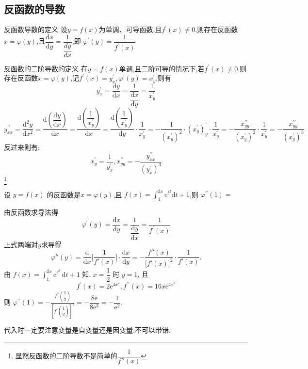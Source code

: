 \documentclass[8pt a4paper, oneside, UTF8]{ctexbook}  %
\begin{document}
\begin{sloppypar}
    \subsection{反函数的导数}
    \begin{defn}{反函数导数的定义}{}
        设$y=f(x)$为单调、可导函数,且$f^{\prime}(x)\neq0$,则存在反函数$x=\varphi(y)$,且$\dfrac{\mathrm{d}x}{\mathrm{d}y}=\dfrac{1}{\dfrac{dy}{dx}}$,即 $\varphi^{\prime}(y)=\dfrac1{f^{\prime}(x)}$
    \end{defn}
    \begin{defn}{反函数的二阶导数的定义}{}
        在$y=f(x)$单调,且二阶可导的情况下,若$f^{\prime}(x)\neq0$,则存在反函数$x=\varphi(y)$,记$f^{\prime}(x)=y_x^{\prime},\varphi^{\prime}\left(y\right)=x_{y}^{\prime}$,则有
        $$
            y_{x}^{\prime}=\dfrac{\mathrm{d}y}{\mathrm{d}x}=\dfrac{1}{\dfrac{\mathrm{d}x}{\mathrm{d}y}}=\frac{1}{x_{y}^{\prime}}
        $$
        $$
            y_{xx}^{\prime\prime}=\dfrac{\mathrm{d}^{2}y}{\mathrm{d}x^{2}}=\dfrac{\mathrm{d}\left(\dfrac{\mathrm{d}y}{\mathrm{d}x}\right)}{\mathrm{d}x}=\dfrac{\mathrm{d}\left(\dfrac{1}{x_{y}^{\prime}}\right)}{\mathrm{d}x}=\dfrac{\mathrm{d}\left(\dfrac{1}{x_{y}^{\prime}}\right)}{\mathrm{d}y}\cdot\dfrac{1}{x_{y}^{\prime}}=-\dfrac{1}{(x_{y}^{\prime})^{2}}\cdot(x_{y}^{\prime})_{y}^{\prime}\cdot\dfrac{1}{x_{y}^{\prime}}=-\dfrac{x_{yy}^{\prime\prime}}{(x_{y}^{\prime})^{2}}\cdot\dfrac{1}{x_{y}^{\prime}}=-\dfrac{x_{yy}^{\prime\prime}}{(x_{y}^{\prime})^{3}}
        $$
        反过来则有:
        $$
            x_{y}^{\prime}=\dfrac{1}{y_{x}^{\prime}},x_{yy}^{\prime\prime}=-\dfrac{y_{xx}^{\prime\prime}}{(y_{x}^{\prime})^{3}}
        $$\footnote{显然反函数的二阶导数不是简单的$\dfrac{1}{f''(x)}$}
    \end{defn}
    \begin{problem}
    设 $y=f(x)$ 的反函数是$x=\varphi(y)$,且 $f(x)=\int_1^{2x}\mathrm{e}^{t^2}\mathrm{d}t+1$,则 $\varphi^{\prime\prime}(1)=$
    \end{problem}
    \begin{solution}
        由反函数求导法得
        $$
            \varphi^{'}(y)=\frac{\mathrm{d}x}{\mathrm{d}y}=\dfrac{1}{\dfrac{\mathrm{d}y}{\mathrm{d}x}}=\frac{1}{f^{'}(x)}
        $$
        上式两端对$y$求导得
        $$
            \varphi''(y)=\frac{\mathrm{d}}{\mathrm{d}x}\biggl[\frac{1}{f'(x)}\biggr]\cdot\frac{\mathrm{d}x}{\mathrm{d}y}=-\frac{f''(x)}{\bigl[f'(x)\bigr]^2}\cdot\frac{1}{f'(x)}.
        $$
        由 $f(x)=\int_1^{2 x} \mathrm{e}^{t^2} \mathrm{~d} t+1$ 知, $x=\dfrac{1}{2}$ 时 $y=1$, 且
        $$
            f^{\prime}(x)=2 \mathrm{e}^{4 x^2}, f^{\prime \prime}(x)=16 x \mathrm{e}^{4 x^2}
        $$
        则 $\varphi^{\prime \prime}(1)=-\frac{f^{\prime \prime}\left(\dfrac{1}{2}\right)}{\left[f^{\prime}\left(\dfrac{1}{2}\right)\right]^3}=-\dfrac{8 \mathrm{e}}{8 \mathrm{e}^3}=-\dfrac{1}{\mathrm{e}^2}$.
    \end{solution}
    \begin{note}
        代入时一定要注意变量是自变量还是因变量,不可以带错.
    \end{note}

\end{sloppypar}
\end{document}

